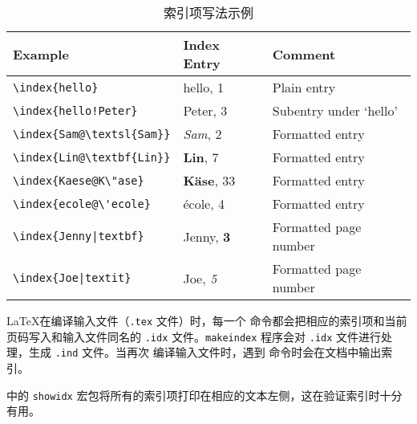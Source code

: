 \documentclass[UTF8]{ctexart}
\begin{document}
\begin{table}[H]
\caption{索引项写法示例}
\label{tab:index}
\begin{center}
\begin{tabular}{@{}lll@{}}
  \textbf{Example} &\textbf{Index Entry} &\textbf{Comment}\\\hline
  \rule{0pt}{1.05em}\verb|\index{hello}| &hello, 1 &Plain entry\\
\verb|\index{hello!Peter}|   &\hspace*{2ex}Peter, 3 &Subentry under `hello'\\
\verb|\index{Sam@\textsl{Sam}}|     &\textsl{Sam}, 2& Formatted entry\\
\verb|\index{Lin@\textbf{Lin}}|     &\textbf{Lin}, 7& Formatted entry\\
\verb|\index{Kaese@K\"ase}|     &\textbf{K\"ase}, 33& Formatted entry\\
\verb.\index{ecole@\'ecole}.     &\'ecole, 4& Formatted entry\\
\verb.\index{Jenny|textbf}.     &Jenny, \textbf{3}& Formatted page number\\
\verb.\index{Joe|textit}.     &Joe, \textit{5}& Formatted page number
\end{tabular}
\end{center}
\end{table}

\LaTeX 在编译输入文件（\texttt{.tex} 文件）时，每一个 \texttt{\index} 命令都会把相应的索引项和当前页码写入和输入文件同名的
\texttt{.idx} 文件。\texttt{makeindex} 程序会对 \texttt{.idx} 文件进行处理，生成 \texttt{.ind} 文件。当再次
编译输入文件时，遇到 \texttt{\printindex} 命令时会在文档中输出索引。

\LaTeXe{} 中的 \texttt{showidx} 宏包将所有的索引项打印在相应的文本左侧，这在验证索引时十分有用。
\end{document}
